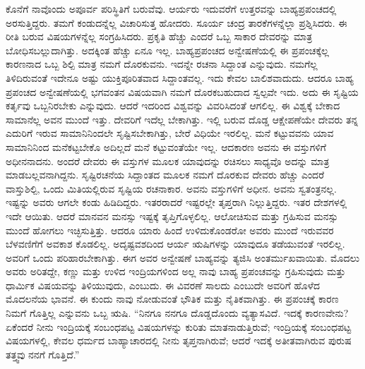 ಕೊನೆಗೆ ನಾವೊಂದು ಅಪೂರ್ವ ಪರಿಸ್ಥಿತಿಗೆ ಬರುವೆವು. ಆರ್ಯರು ಇದುವರೆಗೆ ಉತ್ತರವನ್ನು ಬಾಹ್ಯಪ್ರಪಂಚದಲ್ಲಿ ಅರಸುತ್ತಿದ್ದರು. ತಮಗೆ ಕಂಡುದನ್ನೆಲ್ಲ ವಿಚಾರಿಸುತ್ತ ಹೋದರು. ಸೂರ್ಯ ಚಂದ್ರ ತಾರಕೆಗಳನ್ನೆಲ್ಲಾ ಪ್ರಶ್ನಿಸಿದರು. ಈ ರೀತಿ ಬರುವ ವಿಷಯಗಳನ್ನೆಲ್ಲ ಸಂಗ್ರಹಿಸಿದರು. ಪ್ರಕೃತಿ ಹೆಚ್ಚು ಎಂದರೆ ಒಬ್ಬ ಸಾಕಾರ ದೇವರನ್ನು ಮಾತ್ರ ಬೋಧಿಸಬಲ್ಲುದಾಗಿತ್ತು. ಅದಕ್ಕಿಂತ ಹೆಚ್ಚು ಏನೂ ಇಲ್ಲ. ಬಾಹ್ಯಪ್ರಪಂಚದ ಅನ್ವೇಷಣೆಯಲ್ಲಿ ಈ ಪ್ರಪಂಚಕ್ಕೆಲ್ಲ ಕಾರಣನಾದ ಒಬ್ಬ ಶಿಲ್ಪಿ ಮಾತ್ರ ನಮಗೆ ದೊರಕುವನು. ಇದನ್ನೇ ರಚನಾ ಸಿದ್ದಾಂತ ಎನ್ನುವುದು. ನಮಗೆಲ್ಲ ತಿಳಿದಿರುವಂತೆ ಇದೇನೂ ಅಷ್ಟು ಯುಕ್ತಿಪೂರಿತವಾದ ಸಿದ್ದಾಂತವಲ್ಲ. ಇದು ಕೇವಲ ಬಾಲಿಶವಾದುದು. ಆದರೂ ಬಾಹ್ಯ ಪ್ರಪಂಚದ ಅನ್ವೇಷಣೆಯಲ್ಲಿ ಭಗವಂತನ ವಿಷಯವಾಗಿ ನಮಗೆ ದೊರಕಬಹುದಾದ ಸ್ವಲ್ಪವೇ ಇದು. ಅದು ಈ ಸೃಷ್ಟಿಯ ಕರ್ತೃವು ಒಬ್ಬನಿರಬೇಕು ಎನ್ನುವುದು. ಆದರೆ ಇದರಿಂದ ವಿಶ್ವವನ್ನು ವಿವರಿಸಿದಂತೆ ಆಗಲಿಲ್ಲ. ಈ ವಿಶ್ವಕ್ಕೆ ಬೇಕಾದ ಸಾಮಾನೆಲ್ಲ ಅವನ ಮುಂದೆ ಇತ್ತು. ದೇವರಿಗೆ ಇದೆಲ್ಲ ಬೇಕಾಗಿತ್ತು. ಇಲ್ಲಿ ಬರುವ ದೊಡ್ಡ ಆಕ್ಷೇಪಣೆಯೇ ದೇವರು ತನ್ನ ಎದುರಿಗೆ ಇರುವ ಸಾಮಾನಿನಿಂದಲೇ ಸೃಷ್ಟಿಸಬೇಕಾಗಿತ್ತು, ಬೇರೆ ವಿಧಿಯೇ ಇರಲಿಲ್ಲ. ಮನೆ ಕಟ್ಟುವವನು ಯಾವ ಸಾಮಾನಿನಿಂದ ಮನೆಕಟ್ಟಬೇಕೊ ಅದಿಲ್ಲದೆ ಮನೆ ಕಟ್ಟುವಂತೆಯೇ ಇಲ್ಲ. ಆದಕಾರಣ ಅವನು ಈ ವಸ್ತುಗಳಿಗೆ ಅಧೀನನಾದನು. ಅಂದರೆ ದೇವರು ಈ ವಸ್ತುಗಳ ಮೂಲಕ ಯಾವುದನ್ನು ರಚಿಸಲು ಸಾಧ್ಯವೊ ಅದನ್ನು ಮಾತ್ರ ಮಾಡಬಲ್ಲವನಾಗಿದ್ದನು. ಸೃಷ್ಟಿರಚನೆಯ ಸಿದ್ದಾಂತದ ಮೂಲಕ ನಮಗೆ ದೊರಕುವ ದೇವರು ಹೆಚ್ಚು ಎಂದರೆ ವಾಸ್ತುಶಿಲ್ಪಿ, ಒಂದು ಮಿತಿಯಲ್ಲಿರುವ ಸೃಷ್ಟಿಯ ರಚನಾಕಾರ. ಅವನು ವಸ್ತುಗಳಿಗೆ ಅಧೀನ. ಅವನು ಸ್ವತಂತ್ರನಲ್ಲ. ಇಷ್ಟನ್ನು ಅವರು ಆಗಲೇ ಕಂಡು ಹಿಡಿದಿದ್ದರು. ಇತರರಾದರೆ ಇಷ್ಟರಲ್ಲೇ ತೃಪ್ತರಾಗಿ ನಿಲ್ಲುತ್ತಿದ್ದರು. ಇತರ ದೇಶಗಳಲ್ಲಿ ಇದೇ ಆಯಿತು. ಆದರೆ ಮಾನವನ ಮನಸ್ಸು ಇಷ್ಟಕ್ಕೆ ತೃಪ್ತಿಗೊಳ್ಳಲಿಲ್ಲ. ಆಲೋಚಿಸುವ ಮತ್ತು ಗ್ರಹಿಸುವ ಮನಸ್ಸು ಮುಂದೆ ಹೋಗಲು ಇಚ್ಛಿಸುತ್ತಿತ್ತು. ಆದರೂ ಯಾರು ಹಿಂದೆ ಉಳಿದುಕೊಂಡರೋ ಅವರು ಮುಂದೆ ಇರುವವರ ಬೆಳವಣಿಗೆಗೆ ಅವಕಾಶ ಕೊಡಲಿಲ್ಲ. ಅದೃಷ್ಟವಶದಿಂದ ಆರ್ಯ ಋಷಿಗಳನ್ನು ಯಾವುದೂ ತಡೆಯುವಂತೆ ಇರಲಿಲ್ಲ. ಅವರಿಗೆ ಒಂದು ಪರಿಹಾರಬೇಕಾಗಿತ್ತು. ಈಗ ಅವರ ಅನ್ವೇಷಣೆ ಬಾಹ್ಯವನ್ನು ತ್ಯಜಿಸಿ ಅಂತರ್ಮುಖವಾಯಿತು. ಮೊದಲು ಅವರು ಅರಿತದ್ದೇ, ಕಣ್ಣು ಮತ್ತು ಉಳಿದ ಇಂದ್ರಿಯಗಳಿಂದ ಅಲ್ಲ ನಾವು ಬಾಹ್ಯ ಪ್ರಪಂಚವನ್ನು ಗ್ರಹಿಸುವುದು ಮತ್ತು ಧಾರ್ಮಿಕ ವಿಷಯವನ್ನು ತಿಳಿಯುವುದು, ಎಂಬುದು. ಈ ವಿವರಣೆ ಸಾಲದು ಎಂಬುದೇ ಅವರಿಗೆ ಹೊಳೆದ ಮೊದಲನೆಯ ಭಾವನೆ. ಈ ಕುಂದು ನಾವು ನೋಡುವಂತೆ ಭೌತಿಕ ಮತ್ತು ನೈತಿಕವಾಗಿತ್ತು. ಈ ಪ್ರಪಂಚಕ್ಕೆ ಕಾರಣ ನಿಮಗೆ ಗೊತ್ತಿಲ್ಲ ಎನ್ನುವನು ಒಬ್ಬ ಋಷಿ. “ನಿನಗೂ ನನಗೂ ದೊಡ್ಡದೊಂದು ವ್ಯತ್ಯಾಸವಿದೆ. ಇದಕ್ಕೆ ಕಾರಣವೇನು? ಏಕೆಂದರೆ ನೀನು ಇಂದ್ರಿಯಕ್ಕೆ ಸಂಬಂಧಪಟ್ಟ ವಿಷಯಗಳನ್ನು ಕುರಿತು ಮಾತನಾಡುತ್ತಿರುವೆ; ಇಂದ್ರಿಯಕ್ಕೆ ಸಂಬಂಧಪಟ್ಟ ವಿಷಯಗಳಲ್ಲಿ, ಕೇವಲ ಧರ್ಮದ ಬಾಹ್ಯಾಚಾರದಲ್ಲಿ ನೀನು ತೃಪ್ತನಾಗಿರುವೆ; ಆದರೆ ಇದಕ್ಕೆ ಅತೀತವಾಗಿರುವ ಪುರುಷ ತತ್ತ್ವವು ನನಗೆ ಗೊತ್ತಿದೆ.”


